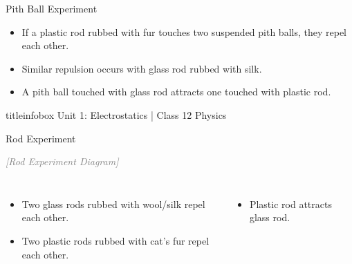 \begin{frame}
\begin{frame}{Pith Ball Experiment}
    \begin{itemize}
    \item If a plastic rod rubbed with fur touches two suspended pith balls, they repel each other.
        
        \item Similar repulsion occurs with glass rod rubbed with silk.
        
        \item A pith ball touched with glass rod attracts one touched with plastic rod.
    \end{itemize}
    
    \vspace{0.3cm}
    
    \begin{center}
    \end{center}
    
    \vfill
    
    \begin{beamercolorbox}[wd=\textwidth,ht=0.5cm,dp=0.1cm,center]{titleinfobox}
        \small\color{coolgray} Unit 1: Electrostatics | Class 12 Physics
    \end{beamercolorbox}
\end{frame}

\begin{frame}{Rod Experiment}
    \begin{center}
        \textcolor{gray}{\textit{[Rod Experiment Diagram]}}
    \end{center}
    
    \begin{columns}
        \begin{itemize}
        \item[a)] Two glass rods rubbed with wool/silk repel each other.
            
            \item[b)] Two plastic rods rubbed with cat's fur repel each other.
        \end{itemize}
        
        \begin{itemize}
        \item[c)] Plastic rod attracts glass rod.
            

\end{itemize}
\end{columns}
\end{frame}
\end{frame}
